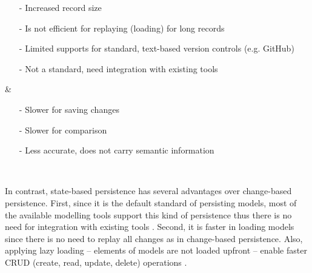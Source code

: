 \begin{table}[t!]
\begin{tabular}
\begin{minipage}[t]{5cm}
            \raggedright
            \begin{itemize}[leftmargin=9pt]
                \setlength\itemsep{2pt}
                \item[-] Increased record size \cite{DBLP:journals/entcs/RobbesL07,DBLP:conf/edoc/KoegelHLHD10}
                \item[-] Is not efficient for replaying (loading) for long records \cite{mens2002state}
                \item[-] Limited supports for standard, text-based version controls (e.g. GitHub) \cite{koegel2010emfstore} 
                \item[-] Not a standard, need integration with existing tools \cite{koegel2010emfstore} 
            \end{itemize}
        \end{minipage}
        & 
        \begin{minipage}[t]{5cm}
            \raggedright
            \begin{itemize}[leftmargin=9pt]
                \setlength\itemsep{2pt}
                \item[-] Slower for saving changes  \cite{mens2002state,daniel2016neoemf,DBLP:conf/models/Espinazo-PaganCM11}
                \item[-] Slower for comparison \cite{DBLP:conf/edoc/KoegelHLHD10}
                \item[-] Less accurate, does not carry semantic information \cite{mens2002state,DBLP:conf/edoc/KoegelHLHD10}  
            \end{itemize}
        \end{minipage}
        \\
        \hline
    \end{tabular} 
\end{table}

In contrast, state-based persistence has several advantages over change-based persistence. First, since it is the default standard of persisting models, most of the available modelling tools support this kind of persistence thus there is no need for integration with existing tools \cite{koegel2010emfstore}. Second, it is faster in loading models since there is no need to replay all changes as in change-based persistence. Also, applying lazy loading -- elements of models are not loaded upfront -- enable faster CRUD (create, read, update, delete) operations \cite{DBLP:conf/models/Espinazo-PaganCM11,daniel2016neoemf}. 

